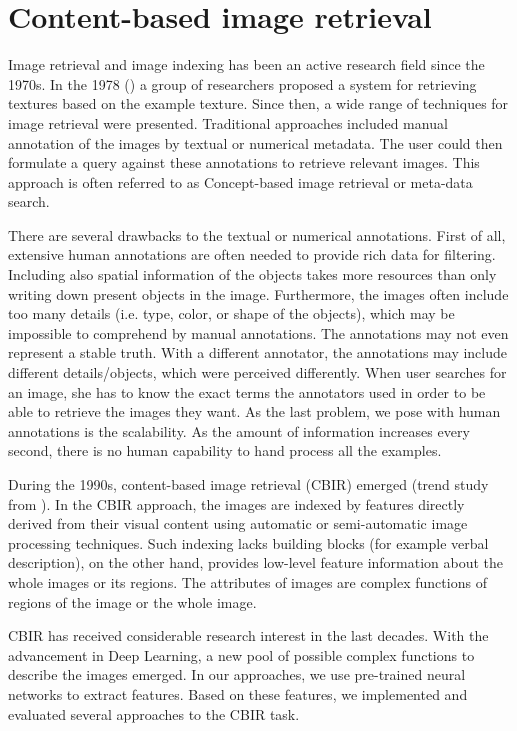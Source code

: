 \chapter{Content-based image retrieval}

Image retrieval and image indexing has been an active research field since the 1970s. In the 1978 (\cite{tamura1978textural}) a group of researchers proposed a system for retrieving textures based on the example texture. Since then, a wide range of techniques for image retrieval were presented. Traditional approaches included manual annotation of the images by textual or numerical metadata. The user could then formulate a query against these annotations to retrieve relevant images. This approach is often referred to as Concept-based image retrieval or meta-data search.

There are several drawbacks to the textual or numerical annotations. First of all, extensive human annotations are often needed to provide rich data for filtering. Including also spatial information of the objects takes more resources than only writing down present objects in the image. Furthermore, the images often include too many details (i.e. type, color, or shape of the objects), which may be impossible to comprehend by manual annotations.  The annotations may not even represent a stable truth. With a different annotator, the annotations may include different details/objects, which were perceived differently. When user searches for an image, she has to know the exact terms the annotators used in order to be able to retrieve the images they want. As the last problem, we pose with human annotations is the scalability. As the amount of information increases every second, there is no human capability to hand process all the examples.

During the 1990s, content-based image retrieval (CBIR) emerged (trend study from \cite{datta2008image}). In the CBIR approach, the images are indexed by features directly derived from their visual content using automatic or semi-automatic image processing techniques. Such indexing lacks building blocks (for example verbal description), on the other hand, provides low-level feature information about the whole images or its regions. The attributes of images are complex functions of regions of the image or the whole image.

CBIR has received considerable research interest in the last decades. With the advancement in Deep Learning, a new pool of possible complex functions to describe the images emerged. In our approaches, we use pre-trained neural networks to extract features. Based on these features, we implemented and evaluated several approaches to the CBIR task.

